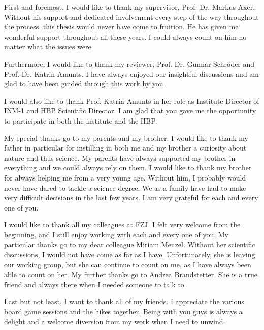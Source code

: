 \label{sec:acknowledgement}
% 
First and foremost, I would like to thank my supervisor, Prof. Dr. Markus Axer.
Without his support and dedicated involvement every step of the way throughout the process, this thesis would never have come to fruition. 
He has given me wonderful support throughout all these years.
I could always count on him no matter what the issues were.

Furthermore, I would like to thank my reviewer, Prof. Dr. Gunnar Schr{\"o}der and Prof. Dr. Katrin Amunts.
I have always enjoyed our insightful discussions and am glad to have been guided through this work by you. 

I would also like to thank Prof. Katrin Amunts in her role as Institute Director of INM-1 and HBP Scientific Director.
I am glad that you gave me the opportunity to participate in both the institute and the HBP.

My special thanks go to my parents and my brother.
I would like to thank my father in particular for instilling in both me and my brother a curiosity about nature and thus science.
My parents have always supported my brother in everything and we could always rely on them.
I would like to thank my brother for always helping me from a very young age.
Without him, I probably would never have dared to tackle a science degree.
We as a family have had to make very difficult decisions in the last few years.
I am very grateful for each and every one of you.

I would like to thank all my colleagues at FZJ.
I felt very welcome from the beginning, and I still enjoy working with each and every one of you.
My particular thanks go to my dear colleague Miriam Menzel.
Without her scientific discussions, I would not have come as far as I have.
Unfortunately, she is leaving our working group, but she can continue to count on me, as I have always been able to count on her.
My further thanks go to Andrea Brandstetter.
She is a true friend and always there when I needed someone to talk to.

Last but not least, I want to thank all of my friends.
I appreciate the various board game sessions and the hikes together.
Being with you guys is always a delight and a welcome diversion from my work when I need to unwind. 